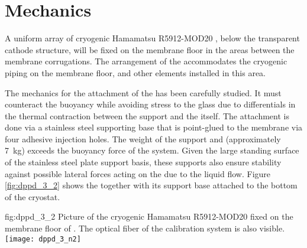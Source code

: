 \section{Mechanics}
\label{sec:dp-pds-mechanics}


A uniform array of \dpnumpmtch cryogenic Hamamatsu R5912-MOD20 , below the transparent cathode structure, will be fixed on the membrane floor in the areas between the membrane corrugations. The arrangement of the  accommodates the cryogenic piping on the membrane floor, and other elements installed in this area.

The mechanics for the attachment of the  has been carefully studied. It must counteract the  buoyancy while avoiding stress to the  glass due to differentials in the thermal contraction between the support and the  itself. The attachment is done via a stainless steel supporting base that is point-glued to the membrane via four adhesive injection holes. The weight of the support and  (approximately \SI{7}{\kg}) exceeds the buoyancy force of the system. Given the large standing surface of the stainless steel plate support basis, these supports also ensure stability against possible lateral forces acting on the  due to the liquid flow. Figure \ref{fig:dppd_3_2} shows the  together with its support base attached to the bottom of the  cryostat.


\begin{dunefigure}{fig:dppd_3_2}
{Picture of the cryogenic Hamamatsu R5912-MOD20  fixed on the membrane floor of . The optical fiber of the calibration system is also visible.}
\texttt{[image: dppd\_3\_n2]}
\end{dunefigure}

